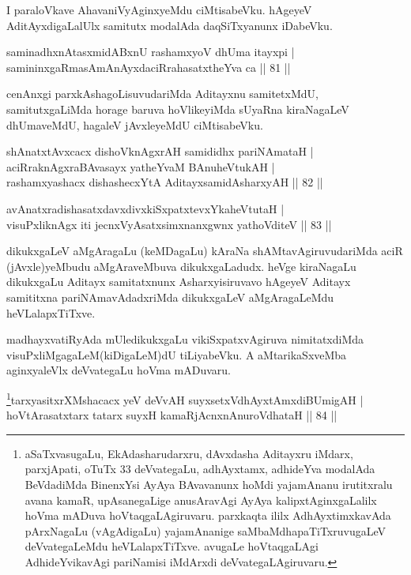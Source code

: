 \begin{artha}
I paraloVkave AhavaniVyAginxyeMdu ciMtisabeVku. hAgeyeV AditAyxdigaLalUlx samitutx modalAda daqSiTxyanunx iDabeVku.
\end{artha}

\begin{shl}
saminadhxnAtasxmidABxnU rashamxyoV dhUma itayxpi | \\
samininxgaRmasAmAnAyxdaciRrahasatxtheYva ca \hfill|| 81 || 
\end{shl}

\begin{artha}
cenAnxgi parxkAshagoLisuvudariMda Aditayxnu samitetxMdU, samitutxgaLiMda horage baruva hoVlikeyiMda sUyaRna kiraNagaLeV dhUmaveMdU, hagaleV jAvxleyeMdU ciMtisabeVku.
\end{artha}

\begin{shl}
shAnatxtAvxcacx dishoV\s knAgxrAH samididhx pariNAmataH | \\
aciRraknAgxraBAvasayx yatheYvaM BAnuheVtukAH | \\
rashamxyashacx dishashecxYtA AditayxsamidAsharxyAH \hfill|| 82 || 
\end{shl}

\begin{shl}
avAnatxradishasatxdavxdivxkiSxpatxtevxYkaheVtutaH | \\
visuPxliknAgx iti jecnxVyAsatxsimxnanxgwnx yathoVditeV \hfill|| 83 || 
\end{shl}

\begin{artha}
dikukxgaLeV aMgAragaLu (keMDagaLu) kAraNa shAMtavAgiruvudariMda aciR (jAvxle)yeMbudu aMgAraveMbuva dikukxgaLadudx. heVge kiraNagaLu dikukxgaLu Aditayx samitatxnunx Asharxyisiruvavo hAgeyeV Aditayx samititxna pariNAmavAdadxriMda dikukxgaLeV aMgAragaLeMdu heVLalapxTiTxve.

madhayxvatiRyAda mUledikukxgaLu vikiSxpatxvAgiruva nimitatxdiMda visuPxliMgagaLeM(kiDigaLeM)dU tiLiyabeVku. A aMtarikaSxveMba aginxyaleVlx deVvategaLu hoVma mADuvaru.
\end{artha}



\begin{shl}
\footnote{aSaTxvasugaLu, EkAdasharudarxru, dAvxdasha Aditayxru  iMdarx, parxjApati, oTuTx 33 deVvategaLu, adhAyxtamx, adhideYva  modalAda BeVdadiMda BinenxYsi AyAya BAvavanunx hoMdi yajamAnanu  irutitxralu avana kamaR, upAsanegaLige anusAravAgi AyAya  kalipxtAginxgaLalilx hoVma mADuva hoVtaqgaLAgiruvaru. parxkaqta ililx  AdhAyxtimxkavAda pArxNagaLu (vAgAdigaLu) yajamAnanige  saMbaMdhapaTiTxruvugaLeV deVvategaLeMdu heVLalapxTiTxve. avugaLe  hoVtaqgaLAgi AdhideYvikavAgi pariNamisi iMdArxdi deVvategaLAgiruvaru.}tarxyasitxrXMshacacx yeV deVvAH suyxsetxV\s dhAyxtAmxdiBUmigAH | \\
hoVtArasatxtarx tatarx suyxH kamaRjAcnxnAnuroVdhataH \hfill|| 84 || 
\end{shl}

